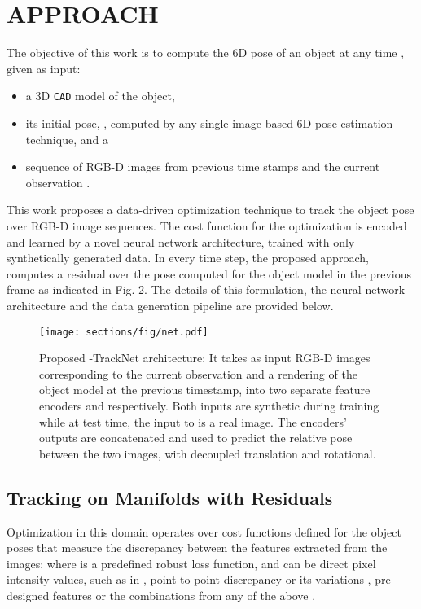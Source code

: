 \documentclass[letterpaper, 10 pt, conference]{ieeeconf}
\begin{document}
\section{APPROACH}
The objective of this work is to compute the 6D pose of an object  at any time , given as input:
\begin{itemize}
    \item a 3D {\tt CAD} model of the object,
    \item its initial pose, , computed by any single-image based 6D pose estimation technique, and a
    \item sequence of RGB-D images  from previous time stamps and the current observation .
\end{itemize}
This work proposes a data-driven optimization technique to track the object pose over RGB-D image sequences. The cost function for the optimization is encoded and learned by a novel neural network architecture, trained with only synthetically generated data. In every time step, the proposed approach, computes a residual over the pose computed for the object model in the previous frame as indicated in Fig. 2. The details of this formulation, the neural network architecture and the data generation pipeline are provided below.


\begin{figure*}[t]
  \centering
  \texttt{[image: sections/fig/net.pdf]}
  \vspace{-.15in}
  \caption{Proposed -TrackNet architecture: It takes as input RGB-D images corresponding to the current observation and a rendering of the object model at the previous timestamp, into two separate feature encoders  and  respectively. Both inputs are synthetic during training while at test time, the input to  is a real image. The encoders' outputs are concatenated and used to predict the relative pose between the two images, with decoupled translation and rotational. \vspace{-0.2in}}
  \label{fig:pipeline}
\end{figure*}



\subsection{Tracking on  Manifolds with Residuals}
\label{sec:se3}

Optimization in this domain operates over cost functions defined for the object poses  that measure the discrepancy  between the features extracted from the images:
 where  is a predefined robust loss function, and  can be direct pixel intensity values, such as in \cite{engel2017direct}, point-to-point discrepancy or its variations \cite{besl1992method}, pre-designed features \cite{hebert2012combined} or the combinations from any of the above \cite{pauwels2015simtrack}. 
\end{document}
